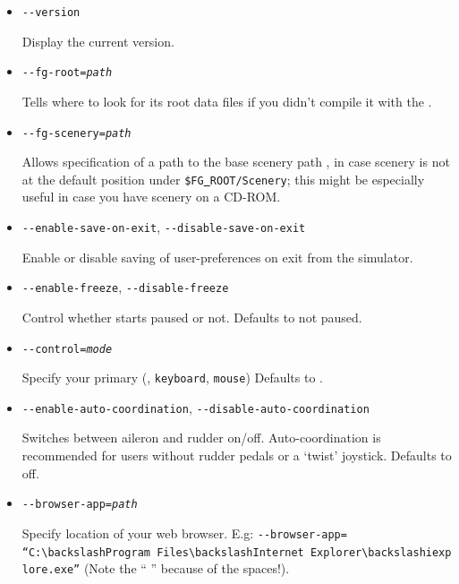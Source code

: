 {\begin{itemize}
  Select the language for this session. e.g. pl, nl, it, fr, en, de.

\item{\texttt{-$ $-version} }

Display the current \FlightGear{} version.

\item{\texttt{-$ $-fg-root={\it path}}}

  Tells \FlightGear{} where to look for its root data files if you
  didn't compile it with the .

\item{\texttt{-$ $-fg-scenery={\it path}}}

  Allows specification of a path to the base scenery path
  , in case scenery is not at the default
  position under \texttt{\$FG\underline{~}ROOT/Scenery}; this might
  be especially useful in case you have scenery on a CD-ROM.

\item{\texttt{-$ $-enable-save-on-exit}, \texttt{-$ $-disable-save-on-exit}}

  Enable or disable saving of user-preferences on exit from the simulator.

\item{\texttt{-$ $-enable-freeze}, \texttt{-$ $-disable-freeze}}

  Control whether \FlightGear{} starts paused or not. Defaults to not paused.

\item{\texttt{-$ $-control={\it mode}}}

  Specify your primary  (,  \texttt{keyboard},
  \texttt{mouse}) Defaults to .

\item{\texttt{-$ $-enable-auto-coordination}, \texttt{-$ $-disable-auto-coordination}}

  Switches  between aileron and rudder on/off. Auto-coordination
  is recommended for users without rudder pedals or a `twist' joystick. Defaults to off.

\item{\texttt{-$ $-browser-app={\it path}}}

  Specify location of your web browser. E.g:
  \texttt{-$ $-browser-app=}\\
  \texttt{``C:$\backslash$Program~Files$\backslash$Internet~Explorer$\backslash$iexplore.exe''}
  (Note the `` '' because of the spaces!).


\end{itemize}}
